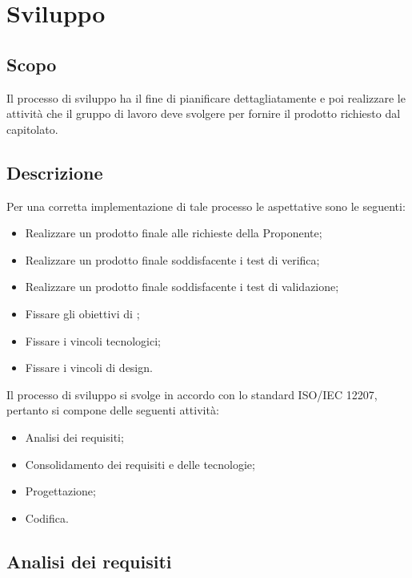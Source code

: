 \documentclass[../NomeDocumento.tex]{subfiles}
\begin{document}
	

\section{Sviluppo}

\subsection{Scopo}

Il processo di sviluppo ha il fine di pianificare dettagliatamente e poi realizzare le attività che il gruppo di lavoro deve svolgere per fornire il prodotto richiesto dal capitolato.

\subsection{Descrizione}

Per una corretta implementazione di tale processo le aspettative sono le seguenti:

\begin{itemize}
	\item Realizzare un prodotto finale  alle richieste della Proponente;
	\item Realizzare un prodotto finale soddisfacente i test di verifica;
	\item Realizzare un prodotto finale soddisfacente i test di validazione;
	\item Fissare gli obiettivi di ;
	\item Fissare i vincoli tecnologici;
	\item Fissare i vincoli di design.
\end{itemize}

\noindent Il processo di sviluppo si svolge in accordo con lo standard ISO/IEC 12207, pertanto si compone delle seguenti attività:

\begin{itemize}
	\item Analisi dei requisiti;
	\item Consolidamento dei requisiti e delle tecnologie;
	\item Progettazione;
	\item Codifica.
\end{itemize}

\subsection{Analisi dei requisiti}
\end{document}
